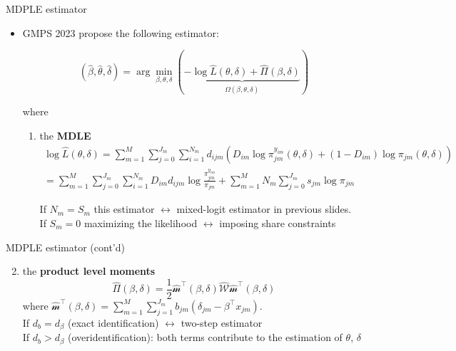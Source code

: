 \begin{frame}{MDPLE estimator}

    \begin{itemize}
    
        \item GMPS 2023 propose the following estimator:
        
        \begin{equation}
            (\hat{\beta},\hat{\theta},\hat{\delta}) = \arg\min_{\beta,\theta,\delta} (\underbrace{-\log\hat{L}(\theta,\delta)+\hat{\Pi}(\beta,\delta)}_{\hat{\Omega}(\beta,\theta,\delta)})
        \end{equation}
        
        where
        
        \begin{enumerate}
            \item the \textbf{MDLE}
                \begin{align}
                    \log\hat{L}(\theta,\delta) =\sum_{m=1}^M\sum_{j=0}^{J_m}\sum_{i=1}^{N_m} d_{ijm}(D_{im}\log \pi_{jm}^{y_{im}}(\theta,\delta) + (1-D_{im})\log\pi_{jm}(\theta,\delta))\\
                     =\sum_{m=1}^M\sum_{j=0}^{J_m}\sum_{i=1}^{N_m} D_{im} d_{ijm} \log\frac{\pi_{jm}^{y_{im}}}{\pi_{jm}} + \sum_{m=1}^M N_m\sum_{j=0}^{J_m}s_{jm}\log\pi_{jm}
                \end{align}
                
                If $N_m = S_m$ this estimator $\leftrightarrow$ mixed-logit estimator in previous slides.\\
                If $S_m = 0$ maximizing the likelihood $\leftrightarrow$ imposing share constraints
        \end{enumerate}
    \end{itemize}

\end{frame}

\begin{frame}{MDPLE estimator (cont'd)}

    \begin{enumerate}
        \setcounter{enumi}{1}
        \item the \textbf{product level moments}
        \begin{equation}
            \hat{\Pi}(\beta,\delta) = \frac{1}{2}\hat{\mathcal{m}}^\intercal(\beta,\delta)\hat{\mathcal{W}}\hat{\mathcal{m}}^\intercal(\beta,\delta)
        \end{equation}
        where $\hat{\mathcal{m}}^\intercal(\beta,\delta) = \sum_{m=1}^M \sum_{j=1}^{J_m} b_{jm}(\delta_{jm}-\beta^\intercal x_{jm})$.\\
        
        If $d_b = d_\beta$ (exact identification) $\leftrightarrow$ two-step estimator\\
        If $d_b > d_\beta$ (overidentification): both terms contribute to the estimation of $\theta$, $\delta$
    \end{enumerate}
\end{frame}


